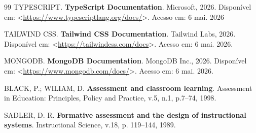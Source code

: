 \documentclass[
12pt,
openright,
oneside,
a4paper,
brazil
]{abntex2}
\begin{document}
\begin{thebibliography}{99}
TYPESCRIPT. \textbf{TypeScript Documentation}. Microsoft, 2026. Disponível em: <\url{https://www.typescriptlang.org/docs/}>. Acesso em: 6 mai. 2026

TAILWIND CSS. \textbf{Tailwind CSS Documentation}. Tailwind Labs, 2026. Disponível em: <\url{https://tailwindcss.com/docs}>. Acesso em: 6 mai. 2026.

MONGODB. \textbf{MongoDB Documentation}. MongoDB Inc., 2026. Disponível em: <\url{https://www.mongodb.com/docs/}>. Acesso em: 6 mai. 2026.

BLACK, P.; WILIAM, D. \textbf{Assessment and classroom learning}. Assessment in Education: Principles, Policy and Practice, v.5, n.1, p.7–74, 1998.

SADLER, D. R. \textbf{Formative assessment and the design of instructional systems}. Instructional Science, v.18, p. 119–144, 1989.

\end{thebibliography}
\end{document}
